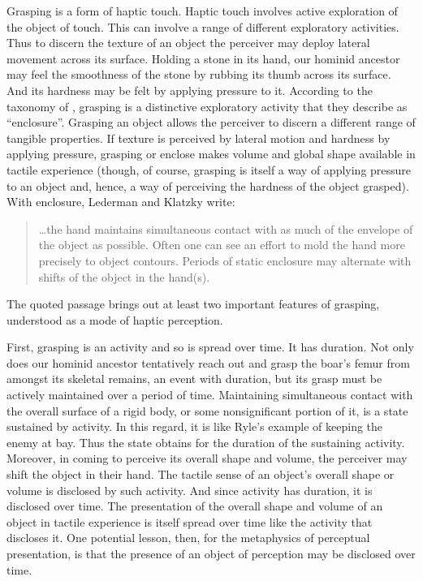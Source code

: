 \documentclass[12pt]{article}
\begin{document}

Grasping is a form of haptic touch. Haptic touch involves active exploration of the object of touch. This can involve a range of different exploratory activities. Thus to discern the texture of an object the perceiver may deploy lateral movement across its surface. Holding a stone in its hand, our hominid ancestor may feel the smoothness of the stone by rubbing its thumb across its surface. And its hardness may be felt by applying pressure to it. According to the taxonomy of \citet{Lederman:1987fr}, grasping is a distinctive exploratory activity that they describe as ``enclosure''. Grasping an object allows the perceiver to discern a different range of tangible properties. If texture is perceived by lateral motion and hardness by applying pressure, grasping or enclose makes volume and global shape available in tactile experience (though, of course, grasping is itself a way of applying pressure to an object and, hence, a way of perceiving the hardness of the object grasped). With enclosure, Lederman and Klatzky write:
\begin{quote}
	\ldots the hand maintains simultaneous contact with as much of the envelope of the object as possible. Often one can see an effort to mold the hand more precisely to object contours. Periods of static enclosure may alternate with shifts of the object in the hand(s). \citep[346--7]{Lederman:1987fr}
\end{quote}
The quoted passage brings out at least two important features of grasping, understood as a mode of haptic perception. 

First, grasping is an activity and so is spread over time. It has duration. Not only does our hominid ancestor tentatively reach out and grasp the boar's femur from amongst its skeletal remains, an event with duration, but its grasp must be actively maintained over a period of time. Maintaining simultaneous contact with the overall surface of a rigid body, or some nonsignificant portion of it, is a state sustained by activity. In this regard, it is like Ryle's \citeyearpar[149]{Ryle:1949qr} example of keeping the enemy at bay. Thus the state obtains for the duration of the sustaining activity. Moreover, in coming to perceive its overall shape and volume, the perceiver may shift the object in their hand. The tactile sense of an object's overall shape or volume is disclosed by such activity. And since activity has duration, it is disclosed over time. The presentation of the overall shape and volume of an object in tactile experience is itself spread over time like the activity that discloses it. One potential lesson, then, for the metaphysics of perceptual presentation, is that the presence of an object of perception may be disclosed over time. 
\end{document}

